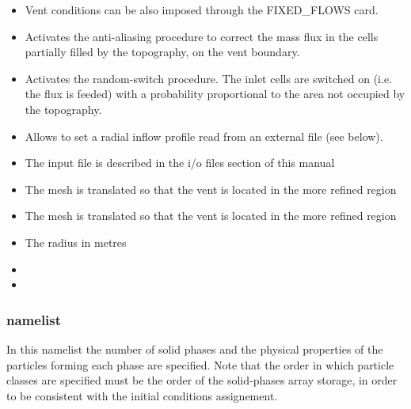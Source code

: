 \begin{itemize}
\item
{}
{Vent conditions can be also imposed through the FIXED\_FLOWS card.}

\item
{}
{Activates the anti-aliasing procedure to correct the mass flux in the cells
partially filled by the topography, on the vent boundary.}

\item
{}
{Activates the random-switch procedure. The inlet cells are switched on
(i.e. the flux is feeded) with a probability proportional to the area not 
occupied by the topography.}

\item
{}
{Allows to set a radial inflow profile read from an external file (see below).}

\item
{}
{The input file is described in the i/o files section of this manual}

\item
{}
{The mesh is translated so that the vent is located in the more refined region}

\item
{}
{The mesh is translated so that the vent is located in the more refined region}

\item
{}
{The radius in metres}

\item
{}
{}

\item
\PDACCONFWDEF{}{}{}{}{}

\end{itemize}

\subsubsection{ namelist}
In this namelist the number of solid phases and the physical properties of the
particles forming each phase are specified. Note that the order in which 
particle classes are specified must be the order of the solid-phases array 
storage, in order to be consistent with the initial conditions assignement.


